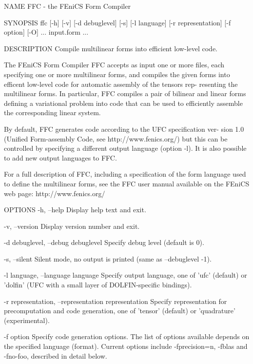 NAME
       FFC - the FEniCS Form Compiler


SYNOPSIS
       ffc  [-h]  [-v]  [-d debuglevel] [-s] [-l language] [-r representation]
       [-f option] [-O] ... input.form ...


DESCRIPTION
       Compile multilinear forms into efficient low-level code.

       The FEniCS Form Compiler FFC accepts as input one or more  files,  each
       specifying  one or more multilinear forms, and compiles the given forms
       into efficent low-level code for automatic assembly of the tensors rep-
       resenting  the multilinear forms. In particular, FFC compiles a pair of
       bilinear and linear forms defining a variational problem into code that
       can be used to efficiently assemble the corresponding linear system.

       By  default, FFC generates code according to the UFC specification ver-
       sion 1.0 (Unified Form-assembly Code, see  http://www.fenics.org/)  but
       this  can  be  controlled  by  specifying  a  different output language
       (option -l). It is also possible to add new output languages to FFC.

       For a full description of FFC, including a specification  of  the  form
       language  used to define the multilinear forms, see the FFC user manual
       available on the FEniCS web page: http://www.fenics.org/


OPTIONS
       -h, --help
              Display help text and exit.

       -v, --version
              Display version number and exit.

       -d debuglevel, --debug debuglevel
              Specify debug level (default is 0).

       -s, --silent
              Silent mode, no output is printed (same as --debuglevel -1).

       -l language, --language language
              Specify output language, one of 'ufc' (default) or 'dolfin' (UFC
              with a small layer of DOLFIN-specific bindings).

       -r representation, --representation representation
              Specify  representation  for precomputation and code generation,
              one of 'tensor' (default) or 'quadrature' (experimental).

       -f option
              Specify code generation options. The list of  options  available
              depends  on  the  specified  language  (format). Current options
              include -fprecision=n, -fblas and -fno-foo, described in  detail
              below.

